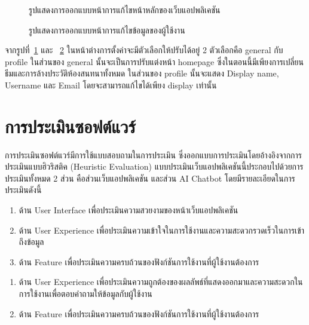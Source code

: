 \documentclass[12pt,oneside,openright,a4paper]{cpe-thai-project}
\begin{document}
\begin{figure}[!h]\centering
\setlength{\fboxrule}{0mm}
\caption{รูปแสดงการออกแบบหน้าการแก้ไขหน้าหลักของเว็บแอปพลิเคชัน}\label{fig:F3.30}
\end{figure}

\begin{figure}[!h]\centering
\setlength{\fboxrule}{0mm}
\caption{รูปแสดงการออกแบบหน้าการแก้ไขข้อมูลของผู้ใช้งาน}\label{fig:F3.31}
\end{figure}
จากรูปที่~\ref{fig:F3.30} และ ~\ref{fig:F3.31} ในหน้าต่างการตั้งค่าจะมีตัวเลือกให้ปรับได้อยู่ 2 ตัวเลือกคือ general กับ profile ในส่วนของ general นั้นจะเป็นการปรับแต่งหน้า homepage ซึ่งในตอนนี้มีเพียงการเปลี่ยนธีมและการล้างประวัติห้องสนทนาทั้งหมด ในส่วนของ profile นั้นจะแสดง Display name, Username และ Email โดยจะสามารถแก้ไขได้เพียง display เท่านั้น

\newpage
\section{การประเมินซอฟต์แวร์}
การประเมินซอฟต์แวร์มีการใช้แบบสอบถามในการประเมิน ซึ่งออกแบบการประเมินโดยอ้างอิงจากการประเมินแบบฮิวริสติค (Heuristic Evaluation) แบบประเมินเว็บแอปพลิเคชันนี้ประกอบไปด้วยการประเมินทั้งหมด 2 ส่วน คือส่วนเว็บแอปพลิเคชัน และส่วน AI Chatbot โดยมีรายละเอียดในการประเมินดังนี้ \\

\begin{enumerate}
\item ด้าน User Interface เพื่อประเมินความสวยงามของหน้าเว็บแอปพลิเคชัน
\item ด้าน User Experience เพื่อประเมินความเข้าใจในการใช้งานและความสะดวกรวดเร็วในการเข้าถึงข้อมูล
\item ด้าน Feature เพื่อประเมินความครบถ้วนของฟังก์ชันการใช้งานที่ผู้ใช้งานต้องการ
\end{enumerate}

\begin{enumerate}
\item ด้าน User Experience เพื่อประเมินความถูกต้องของผลลัพธ์ที่แสดงออกมาและความสะดวกในการใช้งานเพื่อตอบคำถามให้ข้อมูลกับผู้ใช้งาน
\item ด้าน Feature เพื่อประเมินความครบถ้วนของฟังก์ชันการใช้งานที่ผู้ใช้งานต้องการ
\end{enumerate}
\end{document}
